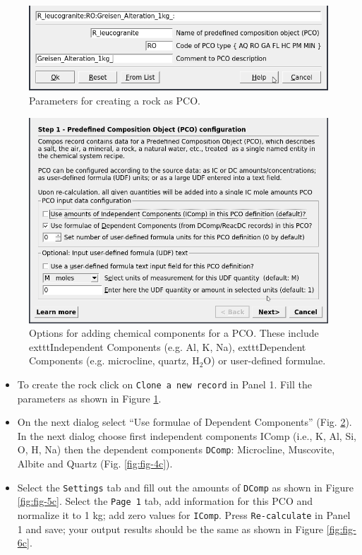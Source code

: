 \documentclass[
]{book}
\begin{document}
\begin{figure}
\includegraphics[width=0.8\linewidth]{figures/module3/fig-2} \caption{Parameters for creating a rock as PCO.}\label{fig:fig-2c}
\end{figure}
\begin{figure}
\includegraphics[width=0.9\linewidth]{figures/module3/fig-3} \caption{Options for adding chemical components for a PCO. These include   exttt{Independent Components} (e.g. Al, K, Na),     exttt{Dependent Components} (e.g. microcline, quartz, H$_2$O) or user-defined formulae. }\label{fig:fig-3c}
\end{figure}

\begin{itemize}
\item
  To create the rock click on \texttt{Clone\ a\ new\ record} in Panel 1. Fill the parameters as shown in Figure \ref{fig:fig-2c}.
\item
  On the next dialog select ``Use formulae of Dependent Components'' (Fig. \ref{fig:fig-3c}). In the next dialog choose first independent components IComp (i.e., K, Al, Si, O, H, Na) then the dependent components \texttt{DComp}: Microcline, Muscovite, Albite and Quartz (Fig. \ref{fig:fig-4c}).
\item
  Select the \texttt{Settings} tab and fill out the amounts of \texttt{DComp} as shown in Figure \ref{fig:fig-5c}. Select the \texttt{Page\ 1} tab, add information for this PCO and normalize it to 1 kg; add zero values for \texttt{IComp}. Press \texttt{Re-calculate} in Panel 1 and save; your output results should be the same as shown in Figure \ref{fig:fig-6c}.
\end{itemize}
\end{document}
